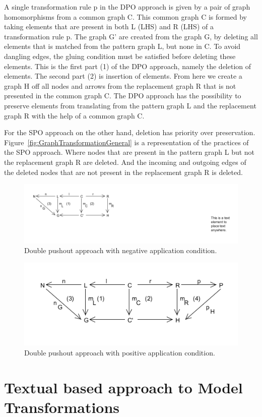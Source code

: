 A single transformation rule p in the DPO approach is given by a pair of graph
homomorphisms from a common graph C. This common graph C is formed by taking
elements that are present in both L (LHS) and R (LHS) of a transformation rule
p. The graph G' are created from the graph G, by deleting all elements that is
matched from the pattern graph L, but none in C. To avoid dangling edges,
the gluing condition must be satisfied before deleting these elements. This is
the first part (1) of the DPO approach, namely the deletion of elements. The
second part (2) is insertion of elements. From here we create a graph H off all
nodes and arrows from the replacement graph R that is not presented in the
common graph C. The DPO approach has the possibility to preserve elements from
translating from the pattern graph L and the replacement graph R with the help
of a common graph C.

For the SPO approach on the other hand, deletion has priority over preservation.
Figure~\ref{fig:GraphTransformationGeneral} is a representation of the practices
of the SPO approach. Where nodes that are present in the pattern graph L but not
the replacement graph R are deleted. And the incoming and outgoing edges of the
deleted nodes that are not present in the replacement graph R is deleted.

\begin{figure}[H]
	\centering
	\includegraphics[scale=0.7]{./Figures/Double_Pushout_NAC.png}
	\caption[The Double Pushout approach with NAC]
	{Double pushout approach with negative application condition.}
	\label{fig:DPO_NAC}
\end{figure}

\begin{figure}[H]
	\centering
	\includegraphics[scale=0.7]{./Figures/Double_Pushout_PAC.png}
	\caption[The Double Pushout approach with PAC]
	{Double pushout approach with positive application condition.}
	\label{fig:DPO_NAC}
\end{figure}

\section{Textual based approach to Model Transformations}



